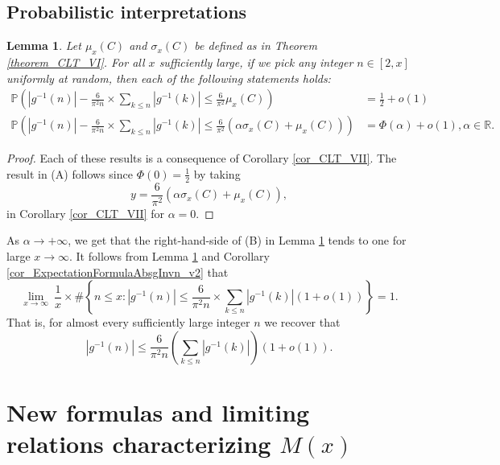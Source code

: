 \documentclass[11pt,reqno,a4letter]{article}
\numberwithin{figure}{section}
\numberwithin{table}{section}
\theoremstyle{plain}
\newtheorem{lemma}[theorem]{Lemma}
\numberwithin{theorem}{section}
\theoremstyle{definition}
\begin{document}
\subsection{Probabilistic interpretations} 
\label{subSection_ProbInterprets_Of_ErdosKacAnalogs} 

\begin{lemma} 
\label{lemma_ProbsOfAbsgInvnDist_v2} 
Let $\mu_x(C)$ and $\sigma_x(C)$ be defined as in 
Theorem \ref{theorem_CLT_VI}. 
For all $x$ sufficiently large, if we pick any integer $n \in [2, x]$ uniformly at random, then 
each of the following statements holds: 
\begin{align*} 
\tag{A}
\mathbb{P}\left(|g^{-1}(n)| - \frac{6}{\pi^2 n} \times \sum_{k \leq n} |g^{-1}(k)| \leq 
     \frac{6}{\pi^2} \mu_x(C) 
     \right) & = \frac{1}{2} + o(1) \\ 
\tag{B} 
\mathbb{P}\left(|g^{-1}(n)| - \frac{6}{\pi^2 n} \times \sum_{k \leq n} |g^{-1}(k)| \leq 
     \frac{6}{\pi^2}\left(\alpha \sigma_x(C) + \mu_x(C)\right)
     \right) & = 
     \Phi\left(\alpha\right) + o(1), \alpha \in \mathbb{R}. 
\end{align*} 
\end{lemma} 
\begin{proof} 
Each of these results is a consequence of Corollary \ref{cor_CLT_VII}. 
The result in (A) follows since $\Phi(0) = \frac{1}{2}$ by taking 
$$y = \frac{6}{\pi^2}\left(\alpha \sigma_x(C) + \mu_x(C)\right),$$ 
in Corollary \ref{cor_CLT_VII} 
for $\alpha = 0$. 
\end{proof} 

\label{remark_ProbsOfAbsgInvnDist_v3} 
As $\alpha \rightarrow +\infty$, 
we get that the right-hand-side of (B) in 
Lemma \ref{lemma_ProbsOfAbsgInvnDist_v2} 
tends to one for large $x \rightarrow \infty$. 
It follows from Lemma \ref{lemma_ProbsOfAbsgInvnDist_v2} and 
Corollary \ref{cor_ExpectationFormulaAbsgInvn_v2} that 
\[
\lim_{x \rightarrow \infty}\ \frac{1}{x} \times \#\left\{n \leq x: 
     |g^{-1}(n)| \leq \frac{6}{\pi^2 n} \times \sum_{k \leq n} |g^{-1}(k)| (1+o(1))\right\} = 1. 
\]
That is, for almost every sufficiently large integer $n$ we recover that 
$$|g^{-1}(n)| \leq \frac{6}{\pi^2 n} \left(\sum_{k \leq n} |g^{-1}(k)|\right) (1+o(1)).$$

\newpage 
\section{New formulas and limiting relations characterizing $M(x)$} 
\label{Section_KeyApplications} 
\end{document}
